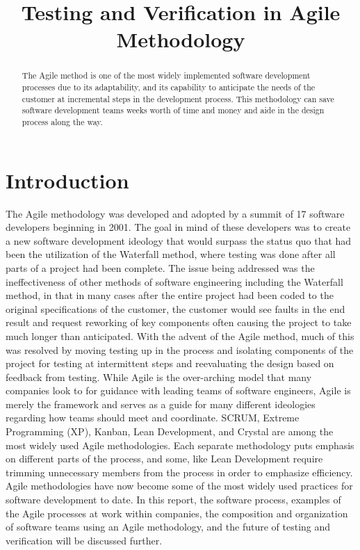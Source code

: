 \documentclass[conference]{IEEEtran}
\begin{document}
\title{Testing and Verification in Agile Methodology}

\author{
}
\maketitle
\begin{abstract}
The Agile method is one of the most widely implemented software development processes due to its adaptability, and its capability to anticipate the needs of the customer at incremental steps in the development process.  This methodology can save software development teams weeks worth of time and money and aide in the design process along the way.
\end{abstract}
\section{Introduction}
The Agile methodology was developed and adopted by a summit of 17 software developers beginning in 2001.  The goal in mind of these developers was to create a new software development ideology that would surpass the status quo that had been the utilization of the Waterfall method, where testing was done after all parts of a project had been complete.  The issue being addressed was the ineffectiveness of other methods of software engineering including the Waterfall method, in that in many cases after the entire project had been coded to the original specifications of the customer, the customer would see faults in the end result and request reworking of key components often causing the project to take much longer than anticipated.\cite{HoA}  With the advent of the Agile method, much of this was resolved by moving testing up in the process and isolating components of the project for testing at intermittent steps and reevaluating the design based on feedback from testing.  While Agile is the over-arching model that many companies look to for guidance with leading teams of software engineers, Agile is merely the framework and serves as a guide for many different ideologies regarding how teams should meet and coordinate.  SCRUM, Extreme Programming (XP), Kanban, Lean Development, and Crystal are among the most widely used Agile methodologies.  Each separate methodology puts emphasis on different parts of the process, and some, like Lean Development require trimming unnecessary members from the process in order to emphasize efficiency.   Agile methodologies have now become some of the most widely used practices for software development to date.  In this report, the software process, examples of the Agile processes at work within companies, the composition and organization of software teams using an Agile methodology, and the future of testing and verification will be discussed further.
\end{document}
